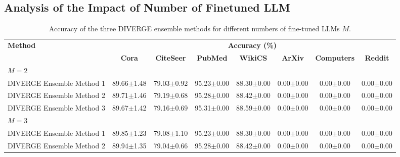 \documentclass[a4paper,fleqn]{cas-sc}
\begin{document}
\subsection{Analysis of the Impact of Number of Finetuned LLM}

\begin{table}[htbp]
\centering
\caption{Accuracy of the three DIVERGE ensemble methods for different numbers of fine-tuned LLMs $M$.}
\label{tab:diverge_num_finetuned_llms}

\small
\setlength{\tabcolsep}{3pt}
\begin{tabular*}{\textwidth}{@{\extracolsep{\fill}} lccccccc @{}}
\toprule
\multirow{2}{*}{\textbf{Method}} & \multicolumn{7}{c}{\textbf{Accuracy (\%)}} \\
\cmidrule(lr){2-8}
 & \textbf{Cora} & \textbf{CiteSeer} & \textbf{PubMed} & \textbf{WikiCS} & \textbf{ArXiv} & \textbf{Computers} & \textbf{Reddit} \\
\midrule
\multicolumn{8}{l}{\textit{$M=2$}} \\
\midrule
DIVERGE Ensemble Method 1 & 89.66{\scriptsize$\pm$1.48} & 79.03{\scriptsize$\pm$0.92} & 95.23{\scriptsize$\pm$0.00} & 88.30{\scriptsize$\pm$0.00} & 0.00{\scriptsize$\pm$0.00} & 0.00{\scriptsize$\pm$0.00} & 0.00{\scriptsize$\pm$0.00} \\
DIVERGE Ensemble Method 2 & 89.71{\scriptsize$\pm$1.46} & 79.19{\scriptsize$\pm$0.68} & 95.28{\scriptsize$\pm$0.00} & 88.42{\scriptsize$\pm$0.00} & 0.00{\scriptsize$\pm$0.00} & 0.00{\scriptsize$\pm$0.00} & 0.00{\scriptsize$\pm$0.00} \\
DIVERGE Ensemble Method 3 & 89.67{\scriptsize$\pm$1.42} & 79.16{\scriptsize$\pm$0.69} & 95.31{\scriptsize$\pm$0.00} & 88.59{\scriptsize$\pm$0.00} & 0.00{\scriptsize$\pm$0.00} & 0.00{\scriptsize$\pm$0.00} & 0.00{\scriptsize$\pm$0.00} \\
\midrule
\multicolumn{8}{l}{\textit{$M=3$}} \\
\midrule
DIVERGE Ensemble Method 1 & 89.85{\scriptsize$\pm$1.23} & 79.08{\scriptsize$\pm$1.10} & 95.23{\scriptsize$\pm$0.00} & 88.30{\scriptsize$\pm$0.00} & 0.00{\scriptsize$\pm$0.00} & 0.00{\scriptsize$\pm$0.00} & 0.00{\scriptsize$\pm$0.00} \\
DIVERGE Ensemble Method 2 & 89.94{\scriptsize$\pm$1.35} & 79.04{\scriptsize$\pm$0.66} & 95.28{\scriptsize$\pm$0.00} & 88.42{\scriptsize$\pm$0.00} & 0.00{\scriptsize$\pm$0.00} & 0.00{\scriptsize$\pm$0.00} & 0.00{\scriptsize$\pm$0.00} \\

\end{tabular*}
\end{table}
\end{document}
